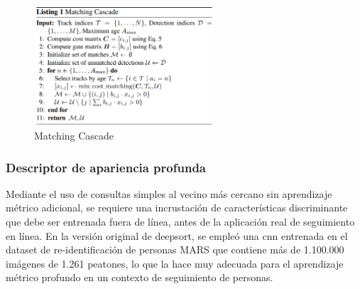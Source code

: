 \begin{figure}[ht]
\centering
\includegraphics[width=0.6\textwidth]{img/chapters/estado-del-arte/matching-cascade.png}
\caption{\label{fig:matching-cascade}Matching Cascade \cite{Wojke2017simple}}
\end{figure}

\subsubsection*{Descriptor de apariencia profunda}
\label{subsubsec:deep-appearance-descriptor}

Mediante el uso de consultas simples al vecino más cercano sin aprendizaje métrico adicional, se requiere una incrustación de características discriminante que debe ser entrenada fuera de línea, antes de la aplicación real de seguimiento en línea. En la versión original de \gls{deepsort}, se empleó una \gls{cnn} entrenada en el dataset de re-identificación de personas MARS \cite{10.1007/978-3-319-46466-4_52} que contiene más de 1.100.000 imágenes de 1.261 peatones, lo que la hace muy adecuada para el aprendizaje métrico profundo en un contexto de seguimiento de personas.


